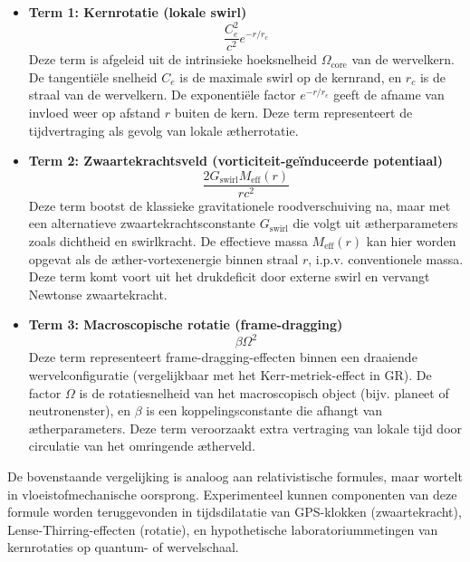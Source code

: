 \begin{itemize}
  \item \textbf{Term 1: Kernrotatie (lokale swirl)}
  \[
  \frac{C_e^2}{c^2} e^{-r/r_c}
  \]
  Deze term is afgeleid uit de intrinsieke hoeksnelheid $\Omega_\text{core}$ van de wervelkern. De tangentiële snelheid $C_e$ is de maximale swirl op de kernrand, en $r_c$ is de straal van de wervelkern. De exponentiële factor $e^{-r/r_c}$ geeft de afname van invloed weer op afstand $r$ buiten de kern. Deze term representeert de tijdvertraging als gevolg van lokale ætherrotatie.

  \item \textbf{Term 2: Zwaartekrachtsveld (vorticiteit-geïnduceerde potentiaal)}
  \[
  \frac{2 G_{\text{swirl}} M_{\text{eff}}(r)}{r c^2}
  \]
  Deze term bootst de klassieke gravitationele roodverschuiving na, maar met een alternatieve zwaartekrachtsconstante $G_{\text{swirl}}$ die volgt uit ætherparameters zoals dichtheid en swirlkracht. De effectieve massa $M_{\text{eff}}(r)$ kan hier worden opgevat als de æther-vortexenergie binnen straal $r$, i.p.v. conventionele massa. Deze term komt voort uit het drukdeficit door externe swirl en vervangt Newtonse zwaartekracht.

  \item \textbf{Term 3: Macroscopische rotatie (frame-dragging)}
  \[
  \beta \Omega^2
  \]
  Deze term representeert frame-dragging-effecten binnen een draaiende wervelconfiguratie (vergelijkbaar met het Kerr-metriek-effect in GR). De factor $\Omega$ is de rotatiesnelheid van het macroscopisch object (bijv. planeet of neutronenster), en $\beta$ is een koppelingsconstante die afhangt van ætherparameters. Deze term veroorzaakt extra vertraging van lokale tijd door circulatie van het omringende ætherveld.

\end{itemize}

De bovenstaande vergelijking is analoog aan relativistische formules, maar wortelt in vloeistofmechanische oorsprong. Experimenteel kunnen componenten van deze formule worden teruggevonden in tijdsdilatatie van GPS-klokken (zwaartekracht), Lense-Thirring-effecten (rotatie), en hypothetische laboratoriummetingen van kernrotaties op quantum- of wervelschaal.